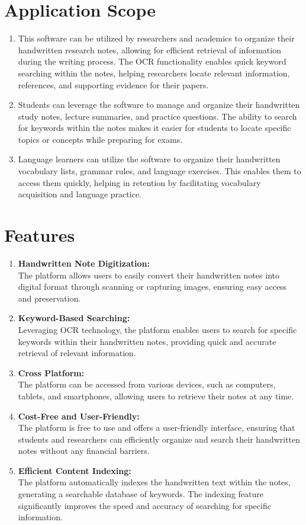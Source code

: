 \section{Application Scope}
 \begin{enumerate}
    \item This software can be utilized by researchers and academics to organize their
    handwritten research notes, allowing for efficient retrieval of information during
    the writing process. The OCR functionality enables quick keyword searching
    within the notes, helping researchers locate relevant information, references, and
    supporting evidence for their papers.
    \item Students can leverage the software to manage and organize their handwritten
    study notes, lecture summaries, and practice questions. The ability to search for
    keywords within the notes makes it easier for students to locate specific topics or
    concepts while preparing for exams.
    \item Language learners can utilize the software to organize their handwritten
    vocabulary lists, grammar rules, and language exercises. This enables them to
    access them quickly, helping in retention by facilitating vocabulary acquisition
    and language practice.
 \end{enumerate}
 \section{Features}
 \begin{enumerate}
    \item \textbf{Handwritten Note Digitization:}\\The platform allows users to easily convert their handwritten notes into digital
    format through scanning or capturing images, ensuring easy access and
    preservation.
    \item \textbf{Keyword-Based Searching:}\\Leveraging OCR technology, the platform enables users to search for specific
    keywords within their handwritten notes, providing quick and accurate retrieval of
    relevant information.
    \item \textbf{Cross Platform:}\\The platform can be accessed from various devices, such as computers, tablets,
    and smartphones, allowing users to retrieve their notes at any time.
    \item \textbf{Cost-Free and User-Friendly:}\\The platform is free to use and offers a user-friendly interface, ensuring that
    students and researchers can efficiently organize and search their handwritten
    notes without any financial barriers.
    \item \textbf{Efficient Content Indexing:}\\The platform automatically indexes the handwritten text within the notes,
    generating a searchable database of keywords. The indexing feature significantly
    improves the speed and accuracy of searching for specific information.
 \end{enumerate}
